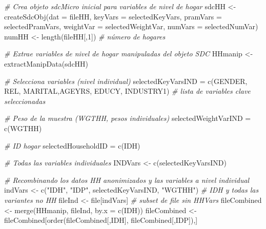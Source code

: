 \documentclass[
]{book}
\newenvironment{Shaded}{\begin{snugshade}}{\end{snugshade}}
\newcommand{\AttributeTok}[1]{\textcolor[rgb]{0.77,0.63,0.00}{#1}}
\newcommand{\CommentTok}[1]{\textcolor[rgb]{0.56,0.35,0.01}{\textit{#1}}}
\newcommand{\DecValTok}[1]{\textcolor[rgb]{0.00,0.00,0.81}{#1}}
\newcommand{\FunctionTok}[1]{\textcolor[rgb]{0.00,0.00,0.00}{#1}}
\newcommand{\NormalTok}[1]{#1}
\newcommand{\OtherTok}[1]{\textcolor[rgb]{0.56,0.35,0.01}{#1}}
\newcommand{\StringTok}[1]{\textcolor[rgb]{0.31,0.60,0.02}{#1}}
\theoremstyle{definition}
\theoremstyle{definition}
\theoremstyle{definition}
\theoremstyle{definition}
\theoremstyle{remark}
\begin{document}
\begin{Shaded}
\begin{Highlighting}[]
\CommentTok{\# Crea objeto sdcMicro inicial para variables de nivel de hogar}
\NormalTok{sdcHH }\OtherTok{\textless{}{-}} \FunctionTok{createSdcObj}\NormalTok{(}\AttributeTok{dat =}\NormalTok{ fileHH, }\AttributeTok{keyVars =}\NormalTok{ selectedKeyVars,}
                      \AttributeTok{pramVars =}\NormalTok{ selectedPramVars, }\AttributeTok{weightVar =}\NormalTok{ selectedWeightVar,}
                      \AttributeTok{numVars =}\NormalTok{ selectedNumVar)}
\NormalTok{numHH }\OtherTok{\textless{}{-}} \FunctionTok{length}\NormalTok{(fileHH[,}\DecValTok{1}\NormalTok{]) }\CommentTok{\# número de hogares}

\CommentTok{\# Extrae variables de nivel de hogar manipuladas del objeto SDC}
\NormalTok{HHmanip }\OtherTok{\textless{}{-}} \FunctionTok{extractManipData}\NormalTok{(sdcHH)}

\CommentTok{\# Selecciona variables (nivel individual)}
\NormalTok{selectedKeyVarsIND }\OtherTok{=} \FunctionTok{c}\NormalTok{(}\StringTok{\textquotesingle{}GENDER\textquotesingle{}}\NormalTok{, }\StringTok{\textquotesingle{}REL\textquotesingle{}}\NormalTok{, }\StringTok{\textquotesingle{}MARITAL\textquotesingle{}}\NormalTok{,}\StringTok{\textquotesingle{}AGEYRS\textquotesingle{}}\NormalTok{,}
                       \StringTok{\textquotesingle{}EDUCY\textquotesingle{}}\NormalTok{, }\StringTok{\textquotesingle{}INDUSTRY1\textquotesingle{}}\NormalTok{) }\CommentTok{\# lista de variables clave seleccionadas}

\CommentTok{\# Peso de la muestra (WGTHH, pesos individuales)}
\NormalTok{selectedWeightVarIND }\OtherTok{=} \FunctionTok{c}\NormalTok{(}\StringTok{\textquotesingle{}WGTHH\textquotesingle{}}\NormalTok{)}

\CommentTok{\# ID hogar}
\NormalTok{selectedHouseholdID }\OtherTok{=} \FunctionTok{c}\NormalTok{(}\StringTok{\textquotesingle{}IDH\textquotesingle{}}\NormalTok{)}

\CommentTok{\# Todas las variables individuales}
\NormalTok{INDVars }\OtherTok{\textless{}{-}} \FunctionTok{c}\NormalTok{(selectedKeyVarsIND)}

\CommentTok{\# Recombinando los datos HH anonimizados y las variables a nivel individual}
\NormalTok{indVars }\OtherTok{\textless{}{-}} \FunctionTok{c}\NormalTok{(}\StringTok{"IDH"}\NormalTok{, }\StringTok{"IDP"}\NormalTok{, selectedKeyVarsIND, }\StringTok{"WGTHH"}\NormalTok{) }\CommentTok{\# IDH y todas las variantes no HH}
\NormalTok{fileInd }\OtherTok{\textless{}{-}}\NormalTok{ file[indVars] }\CommentTok{\# subset de file sin HHVars}
\NormalTok{fileCombined }\OtherTok{\textless{}{-}} \FunctionTok{merge}\NormalTok{(HHmanip, fileInd, }\AttributeTok{by.x =} \FunctionTok{c}\NormalTok{(}\StringTok{\textquotesingle{}IDH\textquotesingle{}}\NormalTok{))}
\NormalTok{fileCombined }\OtherTok{\textless{}{-}}\NormalTok{ fileCombined[}\FunctionTok{order}\NormalTok{(fileCombined[,}\StringTok{\textquotesingle{}IDH\textquotesingle{}}\NormalTok{],  fileCombined[,}\StringTok{\textquotesingle{}IDP\textquotesingle{}}\NormalTok{]),]}


\end{Highlighting}
\end{Shaded}
\end{document}
